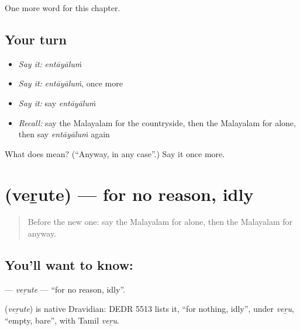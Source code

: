 \begin{grammarlens}[title={What you've built}]
One more word for this chapter.
\end{grammarlens}

\subsection*{Your turn}
\begin{itemize}
\raggedright
  \item \emph{Say it:} \emph{entāyāluṁ}
  \item \emph{Say it:} \emph{entāyāluṁ}, once more
  \item \emph{Say it:} say \emph{entāyāluṁ}
  \item \emph{Recall:} say the Malayalam for the countryside, then the Malayalam for alone, then say \emph{entāyāluṁ} again
\end{itemize}

\begin{tcolorbox}[breakable,colback=teal!4,colframe=teal!35!black,title={Before you move on}]
What does  mean? (\textquotedblleft{}Anyway, in any case\textquotedblright{}.) Say it once more.
\end{tcolorbox}
\section[\texorpdfstring{\ml{വെറുതെ} (veṟute)}{വെറുതെ (veṟute)}]{ (veṟute) — for no reason, idly}

\label{lesson:ML-C317-verute}



\begin{quote}
Before the new one: say the Malayalam for alone, then the Malayalam for anyway.
\end{quote}

\subsection*{You'll want to know: }
\textbf{} — \emph{veṟute} — \textquotedblleft{}for no reason, idly\textquotedblright{}.

\begin{cousinweb}
\textbf{} (\emph{veṟute}) is native Dravidian: DEDR 5513 lists it, \textquotedblleft{}for nothing, idly\textquotedblright{}, under \emph{veṟu}, \textquotedblleft{}empty, bare\textquotedblright{}, with Tamil \emph{veṟu}.
\end{cousinweb}

